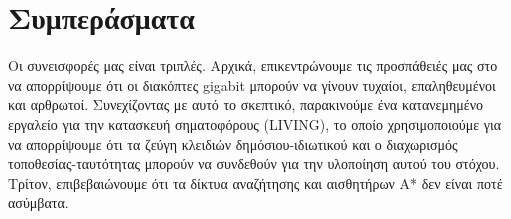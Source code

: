 \documentclass{article}
\begin{document}
\section{Συμπεράσματα}
\label{sec:conc}

Οι συνεισφορές μας είναι τριπλές. Αρχικά, επικεντρώνουμε τις προσπάθειές μας στο να απορρίψουμε ότι οι διακόπτες \textlatin{gigabit} μπορούν να γίνουν τυχαίοι, επαληθευμένοι και αρθρωτοί. Συνεχίζοντας με αυτό το σκεπτικό, παρακινούμε ένα κατανεμημένο εργαλείο για την κατασκευή σηματοφόρους \textlatin{(LIVING)}, το οποίο χρησιμοποιούμε για να απορρίψουμε ότι τα ζεύγη κλειδιών δημόσιου-ιδιωτικού και ο διαχωρισμός τοποθεσίας-ταυτότητας μπορούν να συνδεθούν για την υλοποίηση αυτού του στόχου. Τρίτον, επιβεβαιώνουμε ότι τα δίκτυα αναζήτησης και αισθητήρων A* δεν είναι ποτέ ασύμβατα.
\end{document}
